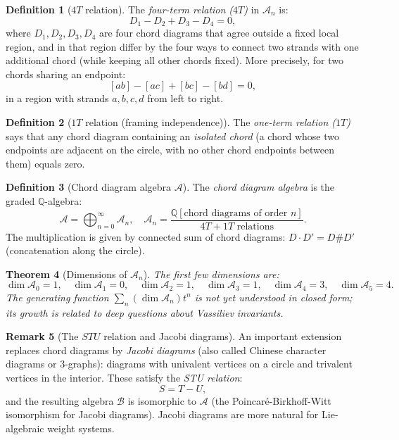 \documentclass[12pt,a4paper]{amsart}
\newtheorem{theorem}{Theorem}[section]
\theoremstyle{definition}
\newtheorem{definition}[theorem]{Definition}
\newtheorem{remark}[theorem]{Remark}
\newcommand{\Q}{\mathbb{Q}}
\newcommand{\Ac}{\mathcal{A}}
\begin{document}
\begin{definition}[$4T$ relation]
The \emph{four-term relation ($4T$)} in $\Ac_n$ is:
\[
  D_1 - D_2 + D_3 - D_4 = 0,
\]
where $D_1, D_2, D_3, D_4$ are four chord diagrams that agree outside
a fixed local region, and in that region differ by the four ways to connect
two strands with one additional chord (while keeping all other chords fixed).
More precisely, for two chords sharing an endpoint:
\[
  [ab] - [ac] + [bc] - [bd] = 0,
\]
in a region with strands $a, b, c, d$ from left to right.
\end{definition}

\begin{definition}[$1T$ relation (framing independence)]
The \emph{one-term relation ($1T$)} says that any chord diagram containing
an \emph{isolated chord} (a chord whose two endpoints are adjacent on the
circle, with no other chord endpoints between them) equals zero.
\end{definition}

\begin{definition}[Chord diagram algebra $\mathcal{A}$]
The \emph{chord diagram algebra} is the graded $\Q$-algebra:
\[
  \Ac = \bigoplus_{n=0}^\infty \Ac_n, \quad
  \Ac_n = \frac{\Q[\text{chord diagrams of order } n]}{4T + 1T \text{ relations}}.
\]
The multiplication is given by connected sum of chord diagrams:
$D \cdot D' = D \# D'$ (concatenation along the circle).
\end{definition}

\begin{theorem}[Dimensions of $\mathcal{A}_n$]
The first few dimensions are:
\[
  \dim \Ac_0 = 1, \quad \dim \Ac_1 = 0, \quad \dim \Ac_2 = 1,
  \quad \dim \Ac_3 = 1, \quad \dim \Ac_4 = 3, \quad \dim \Ac_5 = 4.
\]
The generating function $\sum_n (\dim \Ac_n) t^n$ is not yet understood in
closed form; its growth is related to deep questions about Vassiliev invariants.
\end{theorem}

\begin{remark}[The $STU$ relation and Jacobi diagrams]
An important extension replaces chord diagrams by \emph{Jacobi diagrams}
(also called Chinese character diagrams or $3$-graphs): diagrams with
univalent vertices on a circle and trivalent vertices in the interior.
These satisfy the \emph{STU relation}:
\[
  S = T - U,
\]
and the resulting algebra $\mathcal{B}$ is isomorphic to $\Ac$ (the
Poincar\'e-Birkhoff-Witt isomorphism for Jacobi diagrams).  Jacobi diagrams
are more natural for Lie-algebraic weight systems.
\end{remark}
\end{document}
